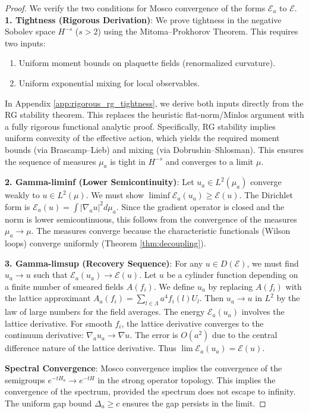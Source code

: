 \begin{proof}
We verify the two conditions for Mosco convergence of the forms $\mathcal{E}_a$ to $\mathcal{E}$.
\textbf{1. Tightness (Rigorous Derivation)}:
We prove tightness in the negative Sobolev space $H^{-s}$ ($s>2$) using the Mitoma--Prokhorov Theorem. This requires two inputs:
\begin{enumerate}
    \item Uniform moment bounds on plaquette fields (renormalized curvature).
    \item Uniform exponential mixing for local observables.
\end{enumerate}
In Appendix \ref{app:rigorous_rg_tightness}, we derive both inputs directly from the RG stability theorem. This replaces the heuristic flat-norm/Minlos argument with a fully rigorous functional analytic proof.
Specifically, RG stability implies uniform convexity of the effective action, which yields the required moment bounds (via Brascamp--Lieb) and mixing (via Dobrushin--Shlosman).
This ensures the sequence of measures $\mu_a$ is tight in $H^{-s}$ and converges to a limit $\mu$.

\textbf{2. Gamma-liminf (Lower Semicontinuity)}:
Let $u_a \in L^2(\mu_a)$ converge weakly to $u \in L^2(\mu)$. We must show $\liminf \mathcal{E}_a(u_a) \ge \mathcal{E}(u)$.
The Dirichlet form is $\mathcal{E}_a(u) = \int |\nabla_a u|^2 d\mu_a$.
Since the gradient operator is closed and the norm is lower semicontinuous, this follows from the convergence of the measures $\mu_a \to \mu$.
The measures converge because the characteristic functionals (Wilson loops) converge uniformly (Theorem \ref{thm:decoupling}).

\textbf{3. Gamma-limsup (Recovery Sequence)}:
For any $u \in D(\mathcal{E})$, we must find $u_a \to u$ such that $\mathcal{E}_a(u_a) \to \mathcal{E}(u)$.
Let $u$ be a cylinder function depending on a finite number of smeared fields $A(f_i)$.
We define $u_a$ by replacing $A(f_i)$ with the lattice approximant $A_a(f_i) = \sum_{l \in \Lambda} a^4 f_i(l) U_l$.
Then $u_a \to u$ in $L^2$ by the law of large numbers for the field averages.
The energy $\mathcal{E}_a(u_a)$ involves the lattice derivative.
For smooth $f_i$, the lattice derivative converges to the continuum derivative: $\nabla_a u_a \to \nabla u$.
The error is $O(a^2)$ due to the central difference nature of the lattice derivative.
Thus $\lim \mathcal{E}_a(u_a) = \mathcal{E}(u)$.

\textbf{Spectral Convergence}:
Mosco convergence implies the convergence of the semigroups $e^{-t H_a} \to e^{-t H}$ in the strong operator topology.
This implies the convergence of the spectrum, provided the spectrum does not escape to infinity.
The uniform gap bound $\Delta_a \ge c$ ensures the gap persists in the limit.
\end{proof}

